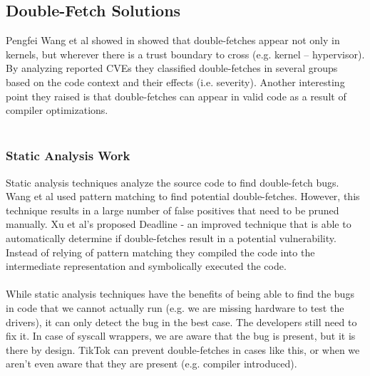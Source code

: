 \documentclass[conference]{IEEEtran}
\begin{document}
\subsection{Double-Fetch Solutions}

Pengfei Wang et al showed in \cite{wang07} showed that double-fetches appear not only in kernels, but wherever there is a trust boundary to cross (e.g. kernel -- hypervisor).
By analyzing reported CVEs they classified double-fetches in several groups based on the code context and their effects (i.e. severity). Another interesting point they raised
is that double-fetches can appear in valid code as a result of compiler optimizations.
\\
\\

\subsubsection{Static Analysis Work}
Static analysis techniques analyze the source code to find double-fetch bugs. Wang et al \cite{usenixwang07} used pattern matching to find potential double-fetches. However, 
this technique results in a large number of false positives that need to be pruned manually. Xu et al's \cite{xu18} proposed Deadline - an improved technique that is
able to automatically determine if double-fetches result in a potential vulnerability. Instead of relying of pattern matching they compiled the code into the intermediate representation
and symbolically executed the code.
\\
\\
While static analysis techniques have the benefits of being able to find the bugs in code that we cannot actually run (e.g. we are missing hardware to test the drivers), it can only 
detect the bug in the best case. The developers still need to fix it. In case of syscall wrappers, we are aware that the bug is present, but it is there by design. TikTok can prevent
double-fetches in cases like this, or when we aren't even aware that they are present (e.g. compiler introduced).
\\
\\
\end{document}
